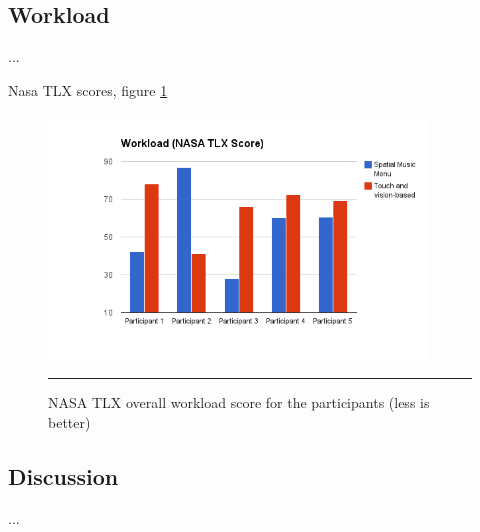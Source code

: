 \subsection{Workload}
...

Nasa TLX scores, figure \ref{fig:resultsnasatlx}

\begin{figure}[htbp]
	\centering
		\includegraphics[width=0.9\textwidth,height=\textheight,keepaspectratio]{./Figures/results_nasatlx.png}
		\rule{35em}{1pt}
	\caption[Results NASA TLX Score]{NASA TLX overall workload score for the participants (less is better)}
	\label{fig:resultsnasatlx}
\end{figure}

\subsection{Discussion}
...





